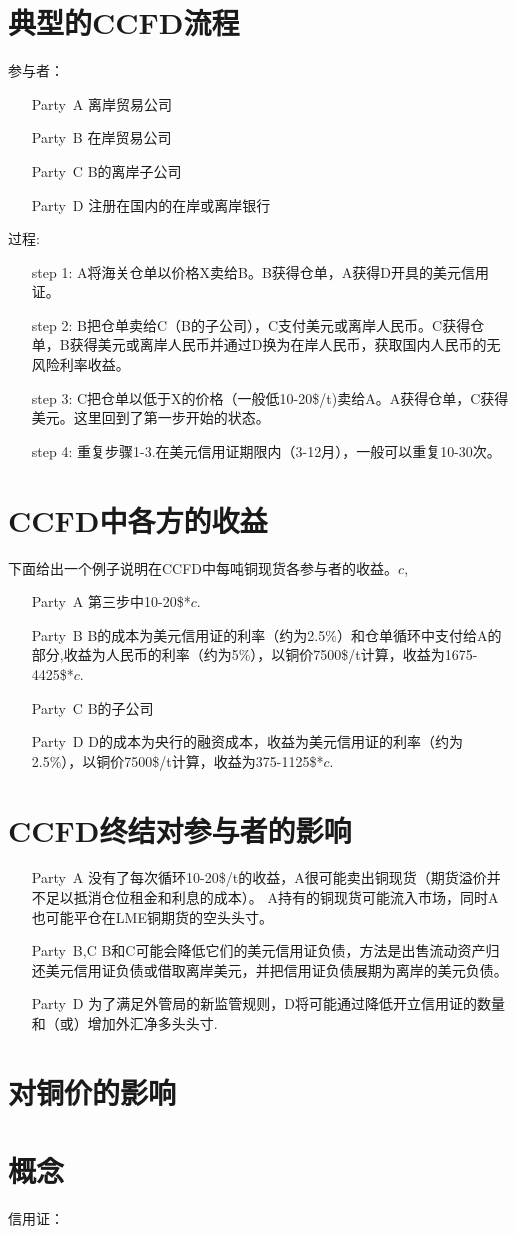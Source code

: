 \documentclass{article}
\begin{document}
\section{典型的CCFD流程}
参与者：\begin{itemize}
    \item[Party\ A] 离岸贸易公司
    \item[Party\ B] 在岸贸易公司
    \item[Party\ C] B的离岸子公司
    \item[Party\ D] 注册在国内的在岸或离岸银行
\end{itemize}
过程:\begin{itemize}
    \item[step 1:] A将海关仓单以价格X卖给B。B获得仓单，A获得D开具的美元信用证。
    \item[step 2:] B把仓单卖给C（B的子公司），C支付美元或离岸人民币。C获得仓单，B获得美元或离岸人民币并通过D换为在岸人民币，获取国内人民币的无风险利率收益。
    \item[step 3:] C把仓单以低于X的价格（一般低10-20\$/t)卖给A。A获得仓单，C获得美元。这里回到了第一步开始的状态。
    \item[step 4:] 重复步骤1-3.在美元信用证期限内（3-12月），一般可以重复10-30次。
\end{itemize}

\section{CCFD中各方的收益}
下面给出一个例子说明在CCFD中每吨铜现货各参与者的收益。$c$,
\begin{itemize}
    \item[Party\ A] 第三步中10-20\$*$c$.
    \item[Party\ B] B的成本为美元信用证的利率（约为2.5\%）和仓单循环中支付给A的部分,收益为人民币的利率（约为5\%），以铜价7500\$/t计算，收益为1675-4425\$*$c$.
    \item[Party\ C] B的子公司
    \item[Party\ D] D的成本为央行的融资成本，收益为美元信用证的利率（约为2.5\%），以铜价7500\$/t计算，收益为375-1125\$*$c$.
\end{itemize}

\section{CCFD终结对参与者的影响}
\begin{itemize}
    \item[Party\ A] 没有了每次循环10-20\$/t的收益，A很可能卖出铜现货（期货溢价并不足以抵消仓位租金和利息的成本）。
                    A持有的铜现货可能流入市场，同时A也可能平仓在LME铜期货的空头头寸。
    \item[Party\ B,C] B和C可能会降低它们的美元信用证负债，方法是出售流动资产归还美元信用证负债或借取离岸美元，并把信用证负债展期为离岸的美元负债。
    \item[Party\ D] 为了满足外管局的新监管规则，D将可能通过降低开立信用证的数量和（或）增加外汇净多头头寸.
\end{itemize}

\section{对铜价的影响}

\section{概念}
信用证：
\end{document}
